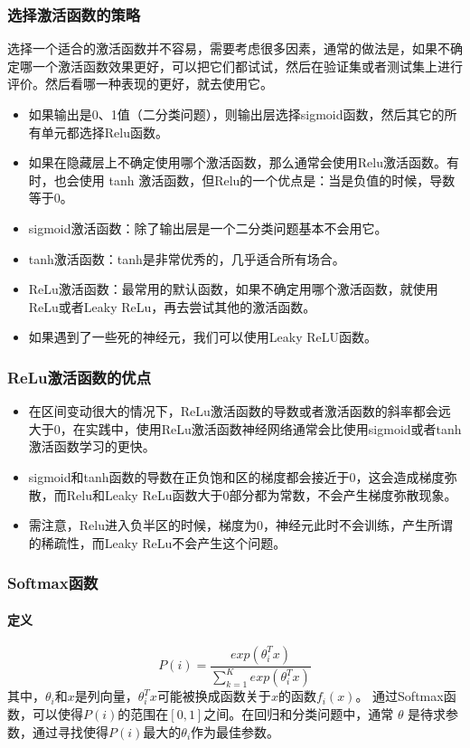 \documentclass[UTF8]{ctexart}
\begin{document}
\subsubsection{选择激活函数的策略}
选择一个适合的激活函数并不容易，需要考虑很多因素，通常的做法是，如果不确定哪一个激活函数效果更好，可以把它们都试试，然后在验证集或者测试集上进行评价。然后看哪一种表现的更好，就去使用它。
\begin{itemize}
	\item 如果输出是0、1值（二分类问题），则输出层选择sigmoid函数，然后其它的所有单元都选择Relu函数。
	\item 如果在隐藏层上不确定使用哪个激活函数，那么通常会使用Relu激活函数。有时，也会使用 tanh 激活函数，但Relu的一个优点是：当是负值的时候，导数等于0。
	\item sigmoid激活函数：除了输出层是一个二分类问题基本不会用它。
	\item tanh激活函数：tanh是非常优秀的，几乎适合所有场合。
	\item ReLu激活函数：最常用的默认函数，如果不确定用哪个激活函数，就使用ReLu或者Leaky ReLu，再去尝试其他的激活函数。
	\item 如果遇到了一些死的神经元，我们可以使用Leaky ReLU函数。
\end{itemize}
\subsubsection{ReLu激活函数的优点}
\begin{itemize}
	\item 在区间变动很大的情况下，ReLu激活函数的导数或者激活函数的斜率都会远大于0，在实践中，使用ReLu激活函数神经网络通常会比使用sigmoid或者tanh激活函数学习的更快。
	\item sigmoid和tanh函数的导数在正负饱和区的梯度都会接近于0，这会造成梯度弥散，而Relu和Leaky ReLu函数大于0部分都为常数，不会产生梯度弥散现象。
	\item 需注意，Relu进入负半区的时候，梯度为0，神经元此时不会训练，产生所谓的稀疏性，而Leaky ReLu不会产生这个问题。
\end{itemize}
\subsubsection{Softmax函数}
\paragraph{定义}
$$P(i) = \frac{exp( \theta_i^T x)}{\sum_{k=1}^{K} exp(\theta_i^T x)}$$
其中，$\theta_i$和$x$是列向量，$\theta_i^T x $可能被换成函数关于$x$的函数$f_i(x)$。
通过Softmax函数，可以使得$ P(i) $的范围在$[0,1]$之间。在回归和分类问题中，通常 $ \theta $ 是待求参数，通过寻找使得$P(i)$最大的$\theta_i$作为最佳参数。
\end{document}
